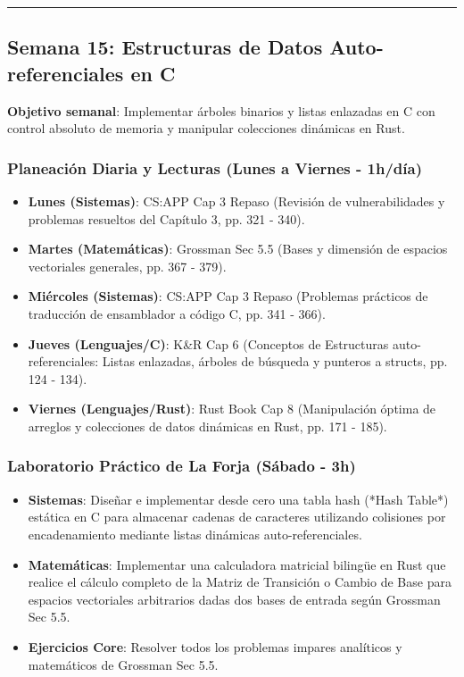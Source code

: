 \documentclass[11pt, a4paper]{article}
\begin{document}
\noindent\rule{\textwidth}{0.4pt}

\subsection{Semana 15: Estructuras de Datos Auto-referenciales en C}
\textbf{Objetivo semanal}: Implementar árboles binarios y listas enlazadas en C con control absoluto de memoria y manipular colecciones dinámicas en Rust.

\subsubsection{Planeación Diaria y Lecturas (Lunes a Viernes - 1h/día)}
\begin{itemize}
    \item \textbf{Lunes (Sistemas)}: CS:APP Cap 3 Repaso (Revisión de vulnerabilidades y problemas resueltos del Capítulo 3, pp. 321 - 340).
    \item \textbf{Martes (Matemáticas)}: Grossman Sec 5.5 (Bases y dimensión de espacios vectoriales generales, pp. 367 - 379).
    \item \textbf{Miércoles (Sistemas)}: CS:APP Cap 3 Repaso (Problemas prácticos de traducción de ensamblador a código C, pp. 341 - 366).
    \item \textbf{Jueves (Lenguajes/C)}: K\&R Cap 6 (Conceptos de Estructuras auto-referenciales: Listas enlazadas, árboles de búsqueda y punteros a structs, pp. 124 - 134).
    \item \textbf{Viernes (Lenguajes/Rust)}: Rust Book Cap 8 (Manipulación óptima de arreglos y colecciones de datos dinámicas en Rust, pp. 171 - 185).
\end{itemize}

\subsubsection{Laboratorio Práctico de La Forja (Sábado - 3h)}
\begin{itemize}
    \item \textbf{Sistemas}: Diseñar e implementar desde cero una tabla hash (*Hash Table*) estática en C para almacenar cadenas de caracteres utilizando colisiones por encadenamiento mediante listas dinámicas auto-referenciales.
    \item \textbf{Matemáticas}: Implementar una calculadora matricial bilingüe en Rust que realice el cálculo completo de la Matriz de Transición o Cambio de Base para espacios vectoriales arbitrarios dadas dos bases de entrada según Grossman Sec 5.5.
    \item \textbf{Ejercicios Core}: Resolver todos los problemas impares analíticos y matemáticos de Grossman Sec 5.5.
\end{itemize}
\end{document}
